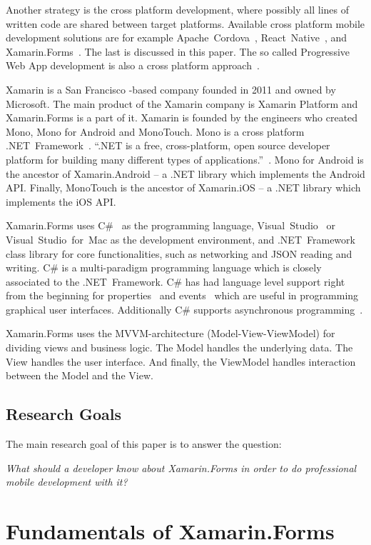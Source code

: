 \documentclass[conference]{IEEEtran}
\begin{document}
Another strategy is the cross platform development, where possibly all lines of written code are shared between target platforms. Available cross platform mobile development solutions are for example Apache~Cordova~\cite{cordova}, React~Native~\cite{react}, and Xamarin.Forms~\cite{xamarin.forms}. The last is discussed in this paper. The so called Progressive Web App development is also a cross platform approach~\cite{7972716}.

Xamarin is a San Francisco -based company founded in 2011 and owned by Microsoft. The main product of the Xamarin company is Xamarin Platform and Xamarin.Forms is a part of it. Xamarin is founded by the engineers who created Mono, Mono for Android and MonoTouch. Mono is a cross platform .NET~Framework~\cite{mono}. ``.NET is a free, cross-platform, open source developer platform for building many different types of applications.''~\cite{dotnet}. Mono for Android is the ancestor of Xamarin.Android -- a .NET library which implements the Android API. Finally, MonoTouch is the ancestor of Xamarin.iOS -- a .NET library which implements the iOS API.

Xamarin.Forms uses C\#~\cite{csharp} as the programming language, Visual~Studio~\cite{vs} or Visual~Studio~for~Mac as the development environment, and .NET~Framework class library for core functionalities, such as networking and JSON reading and writing. C\# is a multi-paradigm programming language which is closely associated to the .NET~Framework. C\# has had language level support right from the beginning for properties~\cite{properties} and events~\cite{events} which are useful in programming graphical user interfaces. Additionally C\# supports asynchronous programming~\cite{asyncro}.

Xamarin.Forms uses the MVVM-architecture (Model-View-ViewModel) for dividing views and business logic. The Model handles the underlying data. The View handles the user interface. And finally, the ViewModel handles interaction between the Model and the View.

\subsection*{Research Goals}

The main research goal of this paper is to answer the question:

\emph{What should a developer know about Xamarin.Forms in order to do professional mobile development with it?}

\section{Fundamentals of Xamarin.Forms}
\end{document}

